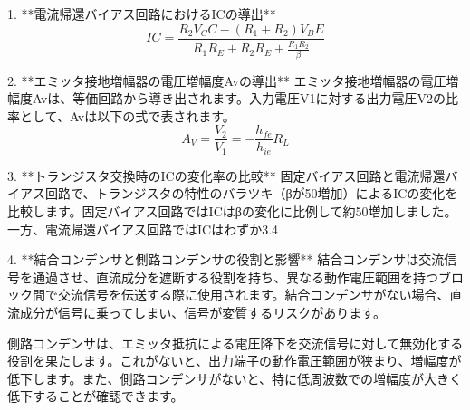 \documentclass[a4paper,11pt,xelatex,ja=standard]{bxjsarticle}
\begin{document}
        1. **電流帰還バイアス回路におけるICの導出**
        \[ IC = \frac{R_2 V_CC - (R_1 + R_2) V_BE}{R_1 R_E + R_2 R_E + \frac{R_1 R_2}{\beta}} \]

        2. **エミッタ接地増幅器の電圧増幅度Avの導出**
        エミッタ接地増幅器の電圧増幅度Avは、等価回路から導き出されます。入力電圧V1に対する出力電圧V2の比率として、Avは以下の式で表されます。
        \[ A_V = \frac{V_2}{V_1} = -\frac{h_{fe}}{h_{ie}} R_L \]

        3. **トランジスタ交換時のICの変化率の比較**
        固定バイアス回路と電流帰還バイアス回路で、トランジスタの特性のバラツキ（βが50増加）によるICの変化を比較します。固定バイアス回路ではICはβの変化に比例して約50増加しました。一方、電流帰還バイアス回路ではICはわずか3.4%

        4. **結合コンデンサと側路コンデンサの役割と影響**
        結合コンデンサは交流信号を通過させ、直流成分を遮断する役割を持ち、異なる動作電圧範囲を持つブロック間で交流信号を伝送する際に使用されます。結合コンデンサがない場合、直流成分が信号に乗ってしまい、信号が変質するリスクがあります。

        側路コンデンサは、エミッタ抵抗による電圧降下を交流信号に対して無効化する役割を果たします。これがないと、出力端子の動作電圧範囲が狭まり、増幅度が低下します。また、側路コンデンサがないと、特に低周波数での増幅度が大きく低下することが確認できます。
\end{document}

